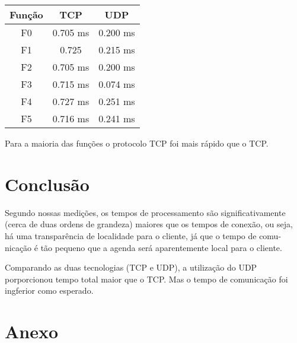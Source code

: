 \documentclass[10pt,a4paper]{article}
\begin{document}
\begin{table}[h!]
  \begin{center}
    \begin{tabular}{ccc}
      
      Função& TCP&  UDP \\
      \hline
      F0 & 0.705 ms & 0.200 ms\\
      F1 & 0.725 & 0.215 ms\\
      F2 & 0.705 ms & 0.200 ms\\
      F3 & 0.715 ms & 0.074 ms\\
      F4 & 0.727 ms & 0.251 ms\\
      F5 & 0.716 ms & 0.241 ms
    \end{tabular}
  \end{center}
\end{table}

Para a maioria das funções o protocolo TCP foi mais rápido que o TCP.

\section{Conclusão}
Segundo nossas medições, os tempos de processamento são significativamente (cerca de duas ordens de grandeza)
maiores que os tempos de conexão, ou seja, há uma transparência de localidade para o cliente, já que o tempo de comu-
nicação é tão pequeno que a agenda será aparentemente local para o cliente.

Comparando as duas tecnologias (TCP e UDP), a utilização do UDP porporcionou  tempo total maior que o TCP. 
Mas o tempo de comunicação foi ingferior como esperado.

\begin{small}
  
\end{small}

\section{Anexo}

\end{document}
